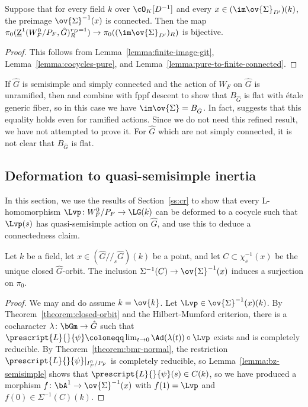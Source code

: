 \begin{lemma}\label{lemma:reduction-fixed-jordan}
    Suppose that for every field $k$ over $\cO_K[D^{-1}]$ and every $x \in (\im \ov{\Sigma}_{D'})(k)$, the preimage $\ov{\Sigma}^{-1}(x)$ is connected. Then the map $\pi_0(\underline{\rm{Z}}^1(W_F^0/P_F, \hat{G})^{r_D = 1}_R) \to \pi_0((\im \ov{\Sigma}_{D'})_R)$ is bijective.
\end{lemma}

\begin{proof}
    This follows from Lemma~\ref{lemma:finite-image-git}, Lemma~\ref{lemma:cocycles-pure}, and Lemma~\ref{lemma:pure-to-finite-connected}.
\end{proof}


\begin{remark}
    If $\hat{G}$ is semisimple and simply connected and the action of $W_F$ on $\hat{G}$ is unramified, then \cite[3.6]{Shotton-irr} and \cite[4.1]{DHKM} combine with fppf descent to show that $B_{\hat{G}}$ is flat with \'etale generic fiber, so in this case we have $\im \ov{\Sigma} = B_{\hat{G}}$. In fact, \cite[3.8]{Shotton-irr} suggests that this equality holds even for ramified actions. Since we do not need this refined result, we have not attempted to prove it. For $\hat{G}$ which are not simply connected, it is not clear that $B_{\hat{G}}$ is flat.
\end{remark}






\subsection{Deformation to quasi-semisimple inertia}\label{ss:qs}

In this section, we use the results of Section~\ref{ss:cr} to show that every L-homomorphism $\Lvp\colon W_F^0/P_F \to \LG(k)$ can be deformed to a cocycle such that $\Lvp(s)$ has quasi-semisimple action on $\hat{G}$, and use this to deduce a connectedness claim.

\begin{lemma}\label{lemma:reduce-to-ss}
    Let $k$ be a field, let $x \in (\hat{G}/\!/_s \hat{G})(k)$ be a point, and let $C \subset \chi_s^{-1}(x)$ be the unique closed $\hat{G}$-orbit. The inclusion $\Sigma^{-1}(C) \to \ov{\Sigma}^{-1}(x)$ induces a surjection on $\pi_0$.
\end{lemma}

\begin{proof}
    We may and do assume $k = \ov{k}$. Let $\Lvp \in \ov{\Sigma}^{-1}(x)(k)$. By Theorem~\ref{theorem:closed-orbit} and the Hilbert-Mumford criterion, there is a cocharacter $\lambda\colon \bGm \to \hat{G}$ such that $\prescript{L}{}{\psi} \coloneqq \lim_{t \to 0} \Ad(\lambda(t)) \circ \Lvp$ exists and is completely reducible. By Theorem~\ref{theorem:bmr-normal}, the restriction $\prescript{L}{}{\psi}|_{I_F^0/P_F}$ is completely reducible, so Lemma~\ref{lemma:bz-semisimple} shows that $\prescript{L}{}{\psi}(s) \in C(k)$, so we have produced a morphism $f\colon \bA^1 \to \ov{\Sigma}^{-1}(x)$ with $f(1) = \Lvp$ and $f(0) \in \Sigma^{-1}(C)(k)$.
\end{proof}

